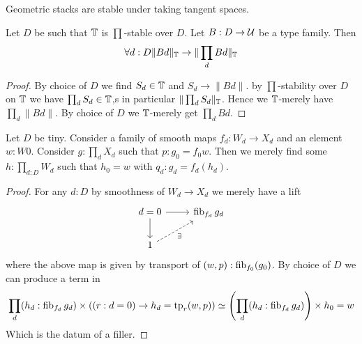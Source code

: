 \begin{corollary}
	Geometric stacks are stable under taking tangent spaces.
\end{corollary}
\begin{lemma}{\label{lemma:TinyStrongLocalChoice}}
	Let $D$ be such that $\mathbb{T}$ is $\prod$-stable over $D$. Let $B : D \to \mathcal{U}$ be a type family. Then
	\[
	\forall d:D \|B d\|_{\mathbb{T}} \to \| \prod_d B d\|_{\mathbb{T}}
	\]		
\end{lemma}
\begin{proof}
	By choice of $D$ we find $S_d \in \mathbb{T}$ and $S_d \to \|B d\|$. by $\prod$-stability over $D$ on $\mathbb{T}$ we have $\prod_d S_d \in \mathbb{T}$,s  in particular $\| \prod_d S_d \|_{\mathbb{T}}$. Hence we $\mathbb{T}$-merely have $\prod_d \| B d\|.$ By choice of $D$ we $\mathbb{T}$-merely get $\prod_d B d$. 
	
\end{proof}
\begin{lemma}[NEEDED?]
	Let $D$ be tiny. Consider a family of smooth maps $f_d : W_d \to X_d$ and an element $w : W 0$.
	Consider $g : \prod_d X_d$ such that $p : g_0 = f_0 w$. Then we merely find some $h : \prod_{d: D} W_d$ such that $h_0 = w$ with $q_d : g_d = f_d (h_d) $.
	
\end{lemma}
\begin{proof}
	For any $d : D$ by smoothness of $W_d \to X_d$ we merely have a lift 
	\[\begin{tikzcd}
		{d=0} & {\fib_{f_d} g_d} \\
		1
		\arrow[from=1-1, to=1-2]
		\arrow[from=1-1, to=2-1]
		\arrow["\exists"', dashed, from=2-1, to=1-2]
	\end{tikzcd}\]
	where the above map is given by transport of $(w , p) : \operatorname{fib}_{f_0}(g_0)$.
	By choice of $D$ we can produce a term in 
	\[
	\prod_d (h_d : \operatorname{fib}_{f_d} g_d) \times ((r : d = 0) \to  h_d = \mathrm{tp}_r(w,p)) \simeq \left(\prod_d (h_d : \operatorname{fib}_{f_d} g_d) \right) \times h_0 = w 
	\]
	Which is the datum of a filler.
\end{proof}

